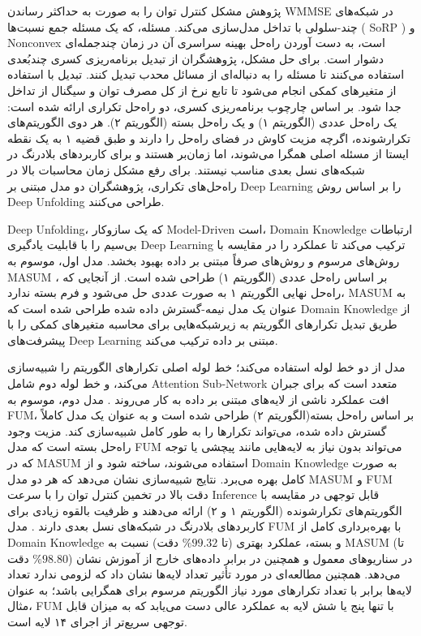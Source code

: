  پژوهش مشکل کنترل توان را به صورت به حداکثر رساندن 
\gls{WMMSE}
 در شبکه‌های چند-سلولی با تداخل مدل‌سازی می‌کند.  مسئله، که یک مسئله جمع نسبت‌ها (
\gls{SoRP}
 ) و 
\gls{Nonconvex}
  است، به دست آوردن راه‌حل بهینه سراسری آن در زمان چندجمله‌ای دشوار است. برای حل  مشکل، پژوهشگران از تبدیل برنامه‌ریزی کسری چندبُعدی استفاده می‌کنند تا مسئله را به دنباله‌ای از مسائل محدب تبدیل کنند.  تبدیل با استفاده از متغیرهای کمکی انجام می‌شود تا تابع نرخ از کل مصرف توان و سیگنال از تداخل جدا شود.
بر اساس  چارچوب برنامه‌ریزی کسری، دو راه‌حل تکراری ارائه شده است: یک راه‌حل عددی (الگوریتم ۱) و یک راه‌حل بسته (الگوریتم ۲). هر دوی  الگوریتم‌های تکرارشونده، اگرچه مزیت کاوش در فضای راه‌حل را دارند و طبق قضیه ۱ به یک نقطه ایستا از مسئله اصلی همگرا می‌شوند، اما زمان‌بر هستند و برای کاربردهای بلادرنگ در شبکه‌های نسل بعدی مناسب نیستند.
برای رفع مشکل زمان محاسبات بالا در راه‌حل‌های تکراری، پژوهشگران دو مدل مبتنی بر 
\gls{Deep Learning}
 را بر اساس روش 
\gls{Deep Unfolding}
  طراحی می‌کنند. 
  
\gls{Deep Unfolding}،
  که یک سازوکار 
\gls{Model-Driven}
   است، 
\gls{Domain Knowledge}
    ارتباطات بی‌سیم را با قابلیت یادگیری 
\gls{Deep Learning}
 ترکیب می‌کند تا عملکرد را در مقایسه با روش‌های مرسوم و روش‌های صرفاً مبتنی بر داده  بهبود بخشد.
مدل اول، موسوم به 
\gls{MASUM}
، بر اساس راه‌حل عددی (الگوریتم ۱) طراحی شده است. از آنجایی که راه‌حل نهایی الگوریتم ۱ به صورت عددی حل می‌شود و فرم بسته ندارد،
\gls{MASUM}
 به عنوان یک مدل نیمه-گسترش داده شده طراحی شده است که 
\gls{Domain Knowledge}
 از طریق تبدیل تکرارهای الگوریتم به زیرشبکه‌هایی برای محاسبه متغیرهای کمکی را با پیشرفت‌های 
\gls{Deep Learning}
 مبتنی بر داده ترکیب می‌کند.
 
   مدل از دو خط لوله استفاده می‌کند؛ خط لوله اصلی تکرارهای الگوریتم را شبیه‌سازی می‌کند، و خط لوله دوم شامل 
\gls{Attention Sub-Network}
 متعدد است که برای جبران افت عملکرد ناشی از لایه‌های مبتنی بر داده به کار می‌روند .
مدل دوم، موسوم به 
\gls{FUM}،
 بر اساس راه‌حل بسته(الگوریتم ۲) طراحی شده است و به عنوان یک مدل کاملاً گسترش داده شده، می‌تواند تکرارها را به طور کامل شبیه‌سازی کند. مزیت وجود راه‌حل بسته است که مدل 
\gls{FUM}
  می‌تواند بدون نیاز به لایه‌هایی مانند پیچشی  یا توجه که در 
\gls{MASUM}
   استفاده می‌شوند، ساخته شود و از 
\gls{Domain Knowledge}
    به صورت کامل بهره می‌برد.
نتایج شبیه‌سازی نشان می‌دهد که هر دو مدل 
\gls{MASUM}
 و 
\gls{FUM}
  دقت بالا در تخمین کنترل توان را با سرعت 
\gls{Inference}
  قابل توجهی در مقایسه با الگوریتم‌های تکرارشونده (الگوریتم ۱ و ۲) ارائه می‌دهند و ظرفیت بالقوه زیادی برای کاربردهای بلادرنگ در شبکه‌های نسل بعدی دارند . مدل 
\gls{FUM}
   با بهره‌برداری کامل از 
\gls{Domain Knowledge}
    و بسته، عملکرد بهتری (تا 
$\%99.32$
     دقت) نسبت به 
\gls{MASUM}
      (تا 
$\%98.80$
       دقت) در سناریوهای معمول و همچنین در برابر داده‌های خارج از آموزش نشان می‌دهد. همچنین مطالعه‌ای در مورد تأثیر تعداد لایه‌ها نشان داد که لزومی ندارد تعداد لایه‌ها برابر با تعداد تکرارهای مورد نیاز الگوریتم مرسوم برای همگرایی باشد؛ به عنوان مثال،
\gls{FUM}
        با تنها پنج یا شش لایه به عملکرد عالی دست می‌یابد که به میزان قابل توجهی سریع‌تر از اجرای ۱۴ لایه است.

